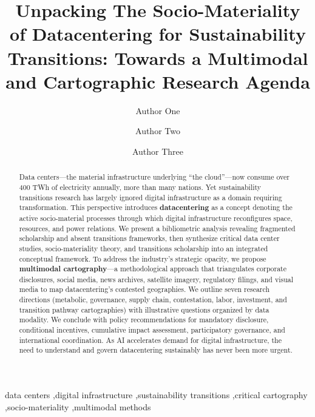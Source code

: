 \documentclass[review]{elsarticle}
\begin{document}
\begin{frontmatter}

\title{Unpacking The Socio-Materiality of Datacentering for Sustainability Transitions: Towards a Multimodal and Cartographic Research Agenda }

\author[1]{Author One}
\author[2]{Author Two}
\author[1]{Author Three}

\address[1]{Dutch Research Institute for Transitions, Erasmus University, Rotterdam, The Netherlands}
\address[2]{Hasso Plattner Institute, University of Potsdam, Potsdam, Germany}

\begin{abstract}
Data centers---the material infrastructure underlying ``the cloud''---now consume over 400 TWh of electricity annually, more than many nations. Yet sustainability transitions research has largely ignored digital infrastructure as a domain requiring transformation. This perspective introduces \textbf{datacentering} as a concept denoting the active socio-material processes through which digital infrastructure reconfigures space, resources, and power relations. We present a bibliometric analysis revealing fragmented scholarship and absent transitions frameworks, then synthesize critical data center studies, socio-materiality theory, and transitions scholarship into an integrated conceptual framework. To address the industry's strategic opacity, we propose \textbf{multimodal cartography}---a methodological approach that triangulates corporate disclosures, social media, news archives, satellite imagery, regulatory filings, and visual media to map datacentering's contested geographies. We outline seven research directions (metabolic, governance, supply chain, contestation, labor, investment, and transition pathway cartographies) with illustrative questions organized by data modality. We conclude with policy recommendations for mandatory disclosure, conditional incentives, cumulative impact assessment, participatory governance, and international coordination. As AI accelerates demand for digital infrastructure, the need to understand and govern datacentering sustainably has never been more urgent.
\end{abstract}

\begin{keyword}
data centers \sep digital infrastructure \sep sustainability transitions \sep critical cartography \sep socio-materiality \sep multimodal methods
\end{keyword}

\end{frontmatter}
\end{document}
